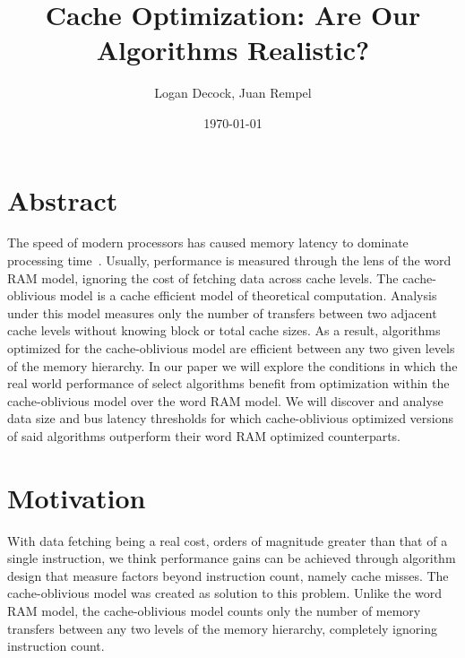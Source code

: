 \documentclass[11pt,letterpaper]{article}
\title{Cache Optimization: Are Our Algorithms Realistic?}
\date{\today}
\author{Logan Decock, Juan Rempel}
\begin{document}
\maketitle

\section{Abstract}
The speed of modern processors has caused memory latency to dominate processing time~\cite{demaine_lecture}. Usually, performance is measured through the lens of the word RAM model, ignoring the cost of fetching data across cache levels.
The cache-oblivious model is a cache efficient model of theoretical computation. Analysis under this model measures only the number of transfers between two adjacent cache levels without knowing block or total cache sizes. As a result, algorithms optimized for the cache-oblivious model are efficient between any two given levels of the memory hierarchy. In our paper we will explore the conditions in which the real world performance of select algorithms benefit from optimization within the cache-oblivious model over the word RAM model. We will discover and analyse data size and bus latency thresholds for which cache-oblivious optimized versions of said algorithms outperform their word RAM optimized counterparts.

\section{Motivation}

With data fetching being a real cost, orders of magnitude greater than that of a single instruction, we think performance gains can be achieved through algorithm design that measure factors beyond instruction count, namely cache misses. The cache-oblivious model was created as solution to this problem. Unlike the word RAM model, the cache-oblivious model counts only the number of memory transfers between any two levels of the memory hierarchy, completely ignoring instruction count.
\end{document}
